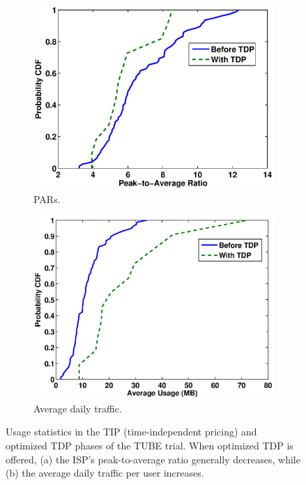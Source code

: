\begin{figure}
\centering
	\begin{subfigure}[b]{0.42\textwidth}
		\includegraphics[width = \textwidth]{Figures/PAR.eps}
		\caption{PARs.}
	\end{subfigure}
	\hspace{-0.03\textwidth}
	\begin{subfigure}[b]{0.42\textwidth}
		\includegraphics[width = \textwidth]{Figures/Avg.eps}
		\caption{Average daily traffic.}
	\end{subfigure}
\vspace{-0.1in}
\caption{Usage statistics in the TIP (time-independent pricing) and optimized TDP phases of the TUBE trial. When optimized TDP is offered, (a) the ISP's peak-to-average ratio generally decreases, while (b) the average daily traffic per user increases.}
\label{fig:par}
\vspace{-0.1in}
\end{figure}